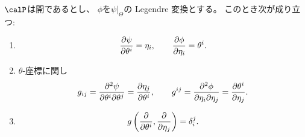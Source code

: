 \documentclass[report]{jlreq}
\begin{document}
\begin{proposition}
    $\calP$は開であるとし、
    $\phi$を$\psi|_\Theta$の Legendre 変換とする。
    このとき次が成り立つ:
    \begin{enumerate}
        \item
            \begin{equation}
                \deldel[\psi]{\theta^i} = \eta_i,
                    \qquad
                    \deldel[\phi]{\eta_i} = \theta^i.
            \end{equation}
        \item $\theta$-座標に関し
            \begin{equation}
                g_{ij}
                    =
                        \frac{
                            \del^2 \psi
                        }{
                            \del \theta^i
                            \del \theta^j
                        }
                    =
                        \deldel[\eta_j]{\theta^i},
                        \qquad
                g^{ij}
                    =
                        \frac{
                            \del^2 \phi
                        }{
                            \del \eta_i
                            \del \eta_j
                        }
                    =
                        \deldel[\theta^i]{\eta_j}.
            \end{equation}
        \item
            \begin{equation}
                g\myparen{
                    \deldel{\theta^i},
                    \deldel{\eta_j}
                }
                    =
                        \delta_i^j.
            \end{equation}
    \end{enumerate}
\end{proposition}
\end{document}
